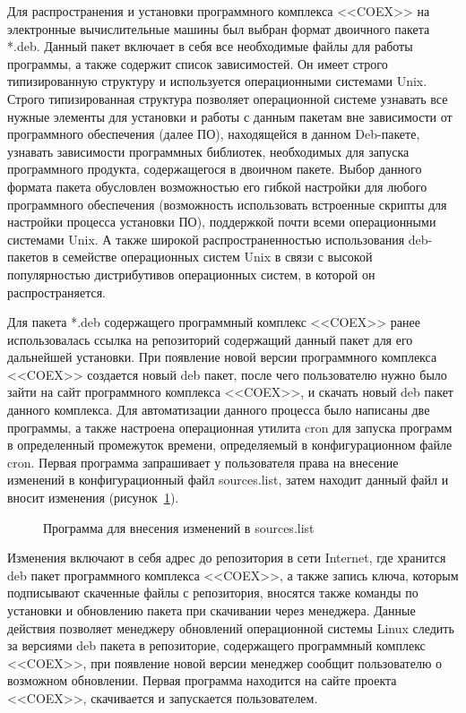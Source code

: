 ﻿Для распространения и установки программного комплекса <<COEX>> на электронные вычислительные машины был выбран формат двоичного пакета *.deb. Данный пакет включает в себя все необходимые файлы для работы программы, а также содержит список зависимостей. Он имеет строго типизированную структуру и используется операционными системами Unix. Строго типизированная структура позволяет операционной системе узнавать все нужные элементы для установки и работы с данным пакетам вне зависимости от программного обеспечения (далее ПО), находящейся в данном Deb-пакете, узнавать зависимости программных библиотек, необходимых для запуска программного продукта, содержащегося в двоичном пакете.  Выбор данного формата пакета обусловлен возможностью его гибкой настройки для любого программного обеспечения (возможность использовать встроенные скрипты для настройки процесса установки ПО), поддержкой почти всеми операционными системами Unix. А также широкой распространенностью использования deb-пакетов в семействе операционных систем Unix в связи с высокой популярностью дистрибутивов операционных систем, в которой он распространяется.~\cite{tecmint}  

Для пакета *.deb содержащего программный комплекс <<COEX>> ранее использовалась ссылка на репозиторий содержащий данный пакет для его дальнейшей установки. При появление новой версии программного комплекса <<COEX>> создается новый deb пакет, после чего пользователю нужно было зайти на сайт программного комплекса <<COEX>>, и скачать новый deb пакет данного комплекса. Для автоматизации данного процесса было написаны две программы, а также настроена операционная утилита cron для запуска программ в определенный промежуток времени, определяемый в конфигурационном файле cron. Первая программа запрашивает у пользователя права на внесение изменений в конфигурационный файл sources.list, затем находит данный файл и вносит изменения (рисунок~\ref{ser_1:ser_1}). 

\begin{figure}[h!]
\caption{ Программа для внесения изменений в sources.list }
\label{ser_1:ser_1}
\end{figure}

Изменения включают в себя адрес до репозитория в сети Internet, где хранится deb пакет программного комплекса <<COEX>>, а также запись ключа, которым подписывают скаченные файлы с репозитория, вносятся также команды по установки и обновлению пакета при скачивании через менеджера. Данные действия позволяет менеджеру обновлений операционной системы Linux следить за версиями deb пакета в репозиторие, содержащего программный комплекс <<COEX>>, при появление новой версии менеджер сообщит пользователю о возможном обновлении. Первая программа находится на сайте проекта <<COEX>>, скачивается и запускается пользователем. 

